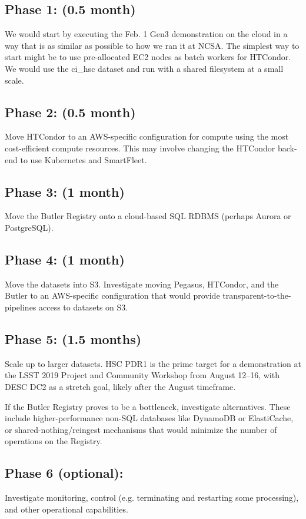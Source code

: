 \subsection{Phase 1: (0.5 month)} \label{sec:phase-1}
We would start by executing the Feb. 1 Gen3 demonstration on the cloud in a way that is as similar as possible to how we ran it at NCSA. The simplest way to start might be to use pre-allocated EC2 nodes as batch workers for HTCondor. We would use the ci_hsc dataset and run with a shared filesystem at a small scale.

\subsection{Phase 2: (0.5 month)} \label{sec:phase-2}
Move HTCondor to an AWS-specific configuration for compute using the most cost-efficient compute resources. This may involve changing the HTCondor back-end to use Kubernetes and SmartFleet.

\subsection{Phase 3: (1 month)} \label{sec:phase-3}
Move the Butler Registry onto a cloud-based SQL RDBMS (perhaps Aurora or PostgreSQL).

\subsection{Phase 4: (1 month)} \label{sec:phase-4}
Move the datasets into S3. Investigate moving Pegasus, HTCondor, and the Butler to an AWS-specific configuration that would provide transparent-to-the-pipelines access to datasets on S3.

\subsection{Phase 5: (1.5 months)} \label{sec:phase-5}
Scale up to larger datasets. HSC PDR1 is the prime target for a demonstration at the LSST 2019 Project and Community Workshop from August 12–16, with DESC DC2 as a stretch goal, likely after the August timeframe.

If the Butler Registry proves to be a bottleneck, investigate alternatives. These include higher-performance non-SQL databases like DynamoDB or ElastiCache, or shared-nothing/reingest mechanisms that would minimize the number of operations on the Registry.

\subsection{Phase 6 (optional):} \label{sec:phase-6}
Investigate monitoring, control (e.g. terminating and restarting some processing), and other operational capabilities.

